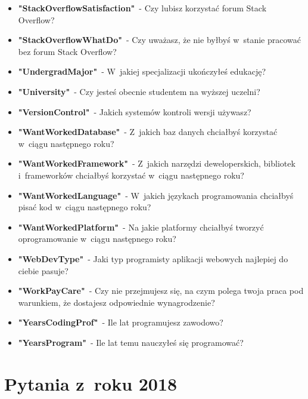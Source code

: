 \begin{appendices}
\begin{itemize}
        \item \textbf{"StackOverflowSatisfaction"}~- Czy lubisz korzystać forum Stack Overflow?
        \item \textbf{"StackOverflowWhatDo"}~- Czy uważasz, że nie byłbyś w~stanie pracować bez forum Stack Overflow?
        \item \textbf{"UndergradMajor"}~- W~jakiej specjalizacji ukończyłeś edukację?
        \item \textbf{"University"}~- Czy jesteś obecnie studentem na wyższej uczelni?
        \item \textbf{"VersionControl"}~- Jakich systemów kontroli wersji używasz?
        \item \textbf{"WantWorkedDatabase"}~- Z~jakich baz danych chciałbyś korzystać w~ciągu następnego roku?
        \item \textbf{"WantWorkedFramework"}~- Z~jakich narzędzi deweloperskich, bibliotek i~frameworków chciałbyś korzystać w~ciągu następnego roku?
        \item \textbf{"WantWorkedLanguage"}~- W~jakich językach programowania chciałbyś pisać kod w~ciągu następnego roku?
        \item \textbf{"WantWorkedPlatform"}~- Na jakie platformy chciałbyś tworzyć oprogramowanie w~ciągu następnego roku?
        \item \textbf{"WebDevType"}~- Jaki typ programisty aplikacji webowych najlepiej do ciebie pasuje?
        \item \textbf{"WorkPayCare"}~- Czy nie przejmujesz się, na czym polega twoja praca pod warunkiem, że dostajesz odpowiednie wynagrodzenie?
        \item \textbf{"YearsCodingProf"}~- Ile lat programujesz zawodowo?
        \item \textbf{"YearsProgram"}~- Ile lat temu nauczyłeś się programować?
    \end{itemize}


    \section{Pytania z~roku 2018}\label{pytania-2018}



\end{appendices}

